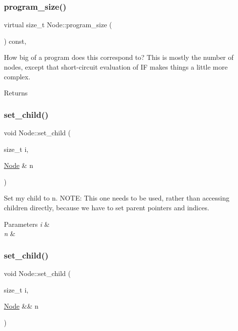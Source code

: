 \subsubsection{\texorpdfstring{program\+\_\+size()}{program\_size()}}
{\footnotesize\ttfamily virtual size\+\_\+t Node\+::program\+\_\+size (\begin{DoxyParamCaption}{ }\end{DoxyParamCaption}) const\hspace{0.3cm}{\ttfamily [inline]}, {\ttfamily [virtual]}}

How big of a program does this correspond to? This is mostly the number of nodes, except that short-\/circuit evaluation of IF makes things a little more complex. \begin{DoxyReturn}{Returns}

\end{DoxyReturn}
\mbox{\label{class_node_afff50c3712b8e30fffd479cad4eee023}} 
\subsubsection{\texorpdfstring{set\+\_\+child()}{set\_child()}\hspace{0.1cm}{\footnotesize\ttfamily [1/2]}}
{\footnotesize\ttfamily void Node\+::set\+\_\+child (\begin{DoxyParamCaption}\item[{size\+\_\+t}]{i,  }\item[{\hyperlink{class_node}{Node} \&}]{n }\end{DoxyParamCaption})\hspace{0.3cm}{\ttfamily [inline]}}

Set my child to n. N\+O\+TE\+: This one needs to be used, rather than accessing children directly, because we have to set parent pointers and indices. 
\begin{DoxyParams}{Parameters}
{\em i} & \\
\hline
{\em n} & \\
\hline
\end{DoxyParams}
\mbox{\label{class_node_a486882370d2c9592c6eabb52a3289253}} 
\subsubsection{\texorpdfstring{set\+\_\+child()}{set\_child()}\hspace{0.1cm}{\footnotesize\ttfamily [2/2]}}
{\footnotesize\ttfamily void Node\+::set\+\_\+child (\begin{DoxyParamCaption}\item[{size\+\_\+t}]{i,  }\item[{\hyperlink{class_node}{Node} \&\&}]{n }\end{DoxyParamCaption})\hspace{0.3cm}{\ttfamily [inline]}}

